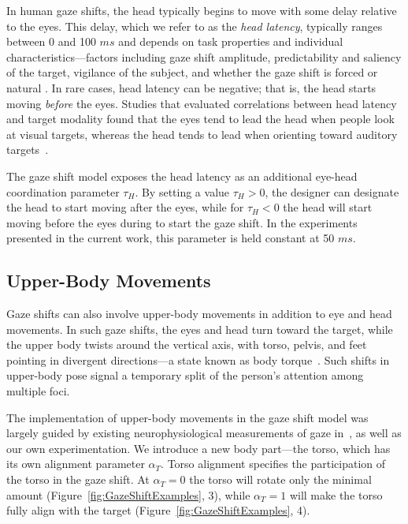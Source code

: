 In human gaze shifts, the head typically begins to move with some delay relative to the eyes. This delay, which we refer to as the \emph{head latency}, typically ranges between 0 and 100 $ms$ and depends on task properties and individual characteristics---factors including gaze shift amplitude, predictability and saliency of the target, vigilance of the subject, and whether the gaze shift is forced or natural \cite{pelz2001coordination,zangemeister1982types}. In rare cases, head latency can be negative; that is, the head starts moving \emph{before} the eyes. Studies that evaluated correlations between head latency and target modality found that the eyes tend to lead the head when people look at visual targets, whereas the head tends to lead when orienting toward auditory targets~\cite{goldring1996combined,goossens1997human}.

The gaze shift model exposes the head latency as an additional eye-head coordination parameter $\tau_H$. By setting a value $\tau_H > 0$, the designer can designate the head to start moving after the eyes, while for $\tau_H < 0$ the head will start moving before the eyes during to start the gaze shift. In the experiments presented in the current work, this parameter is held constant at 50 $ms$.

\subsection{Upper-Body Movements}
\label{sec:GazeShiftUpperBody}

Gaze shifts can also involve upper-body movements in addition to eye and head movements. In such gaze shifts, the eyes and head turn toward the target, while the upper body twists around the vertical axis, with torso, pelvis, and feet pointing in divergent directions---a state known as body torque~\cite{schegloff1998bodytorque}. Such shifts in upper-body pose signal a temporary split of the person's attention among multiple foci.

The implementation of upper-body movements in the gaze shift model was largely guided by existing neurophysiological measurements of gaze in~\cite{mccluskey2007monkeys}, as well as our own experimentation. We introduce a new body part---the torso, which has its own alignment parameter $\alpha_T$. Torso alignment specifies the participation of the torso in the gaze shift. At $\alpha_T = 0$ the torso will rotate only the minimal amount (Figure~\ref{fig:GazeShiftExamples}, 3), while $\alpha_T = 1$ will make the torso fully align with the target (Figure~\ref{fig:GazeShiftExamples}, 4).

